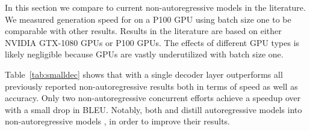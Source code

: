 In this section we compare \tvsdconv{} to current non-autoregressive models in the literature. 
We measured generation speed for \tvsdconv{} on a P100 GPU using batch size one to be comparable with other results.
Results in the literature are based on either NVIDIA GTX-1080 GPUs or P100 GPUs. 
The effects of different GPU types is likely negligible because GPUs are vastly underutilized with batch size one.

Table~\ref{tab:smalldec} shows that \tvsdconv{} with a single decoder layer outperforms all previously reported non-autoregressive results both in terms of speed as well as accuracy.
Only two non-autoregressive concurrent efforts \citep{guo2018non,li2019hintbased} achieve a speedup over \tvsdconv{} with a small drop in BLEU.
Notably, both \citet{guo2018non} and \citet{li2019hintbased} distill autoregressive models into non-autoregressive models \citep{hinton2015distilling}, in order to improve their results.

